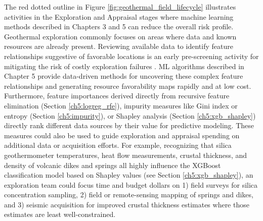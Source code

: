 The red dotted outline in Figure \ref{fig:geothermal_field_lifecycle} illustrates activities in the Exploration and Appraisal stages where machine learning methods described in Chapters 3 and 5 can reduce the overall risk profile. Geothermal exploration commonly focuses on areas where data and known resources are already present. Reviewing available data to identify feature relationships suggestive of favorable locations is an early pre-screening activity for mitigating the risk of costly exploration failures \citep{doughty_geovision_2018}. ML algorithms described in Chapter 5 provide data-driven methods for uncovering these complex feature relationships and generating resource favorability maps rapidly and at low cost. Furthermore, feature importances derived directly from recursive feature elimination (Section \ref{ch5:logreg_rfe}), impurity measures like Gini index or entropy (Section \ref{ch5:impurity}), or Shapley analysis (Section \ref{ch5:xgb_shapley}) directly rank different data sources by their value for predictive modeling. These measures could also be used to guide exploration and appraisal spending on additional data or acquisition efforts. For example, recognizing that silica geothermometer temperatures, heat flow measurements, crustal thickness, and density of volcanic dikes and springs all highly influence the XGBoost classification model based on Shapley values (see Section \ref{ch5:xgb_shapley}), an exploration team could focus time and budget dollars on 1) field surveys for silica concentration sampling, 2) field or remote-sensing mapping of springs and dikes, and 3) seismic acquisition for improved crustal thickness estimates where those estimates are least well-constrained. 